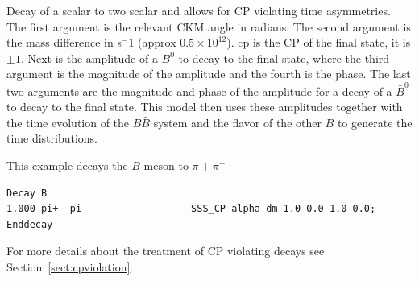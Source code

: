 \Expl
Decay of a scalar to two scalar and allows for CP violating 
time asymmetries. The first argument is the relevant CKM
angle in radians. The second argument is the mass difference
in s$^-1$ (approx $0.5\times 10^{12}$). 
cp is the CP of the final state, it is $\pm 1$. 
Next is the amplitude 
of a $B^0$ to decay to the final state, where the third argument is the 
magnitude of the amplitude and the fourth is the phase. The
last two arguments are the magnitude and phase of the
amplitude for a decay of a $\bar B^0$ to decay to the 
final state. This model then uses these amplitudes 
together with the time evolution of the
$B\bar B$ system and the flavor of the other
$B$ to generate the time distributions.

\Example
This example decays the $B$ meson to $\pi+\pi^-$
\begin{verbatim}
Decay B
1.000 pi+  pi-                  SSS_CP alpha dm 1.0 0.0 1.0 0.0;
Enddecay
\end{verbatim}

\Notes
For more details about the treatment of CP violating decays 
see Section~\ref{sect:cpviolation}.



\label{ssscppng}



